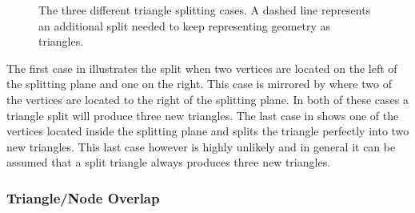 \begin{figure}
  \centering
  \hspace{5mm}
  \hspace{5mm}

  \vspace{3mm}
  \parbox{10cm}{\caption[The three different triangle splitting
      cases.]{The three different triangle splitting cases. A dashed
      line represents an additional split needed to keep representing
      geometry as triangles.}\label{fig:splittingCases}}
\end{figure}

The first case in  illustrates the split when two
vertices are located on the left of the splitting plane and one on the
right. This case is mirrored by  where two of the
vertices are located to the right of the splitting plane. In both of these cases
a triangle split will produce three new triangles. The last case in
 shows one of the vertices located inside the
splitting plane and splits the triangle perfectly into two new triangles. This
last case however is highly unlikely and in general it can be assumed that a
split triangle always produces three new triangles.


\subsubsection{Triangle/Node Overlap}


